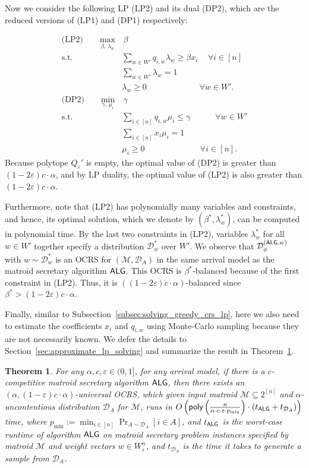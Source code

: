 \documentclass[11pt]{article}
\newcommand{\D}{\mathcal D}
\newcommand{\M}{{\mathcal M}}
\newcommand{\alg}{\textnormal{\sffamily ALG}}
\newcommand{\eps}{\varepsilon}
\newcommand{\poly}{\textnormal{\sffamily poly}}
\newtheorem{theorem}{Theorem}[section]
\begin{document}
Now we consider the following LP (LP2) and its dual (DP2), which are the reduced versions of (LP1) and (DP1) respectively:

\begin{align}\label{eq:secretary_to_crs_lp_2}
    \textrm{(LP2)}\qquad\max_{\beta,\,\lambda_w}&\,\beta\nonumber\\
    \textrm{s.t. }& \sum_{w\in W'} q_{i,w}\lambda_w\ge\beta x_i \quad\,\forall i\in [n]\nonumber\\
    & \sum_{w\in W'}\lambda_w=1\nonumber\\
    & \lambda_w\ge 0 \qquad\qquad\qquad\,\,\forall w\in W'.\nonumber\\
    \textrm{(DP2)}\qquad\min_{\gamma,\,\mu_i}&\,\gamma\nonumber\\
    \textrm{s.t. }& \sum_{i\in[n]} q_{i,w}\mu_i\le\gamma \qquad\,\,\,\,\,\,\forall w\in W'\nonumber\\
    & \sum_{i\in[n]}x_i\mu_i=1\nonumber\\
    & \mu_i\ge 0 \qquad\qquad\qquad\,\,\,\,\forall i\in [n].
\end{align}
Because polytope $Q_{\eps}'$ is empty, the optimal value of (DP2) is greater than $(1-2\eps)c\cdot\alpha$, and by LP duality, the optimal value of (LP2) is also greater than $(1-2\eps)c\cdot\alpha$.

Furthermore, note that (LP2) has polynomially many variables and constraints, and hence, its optimal solution, which we denote by $(\beta^*,\lambda^*_w)$, can be computed in polynomial time. By the last two constraints in (LP2), variables $\lambda^*_{w}$ for all $w\in W'$ together specify a distribution $\D_{w}^*$ over $W'$. We observe that $\D_{\phi}^{(\alg,w)}$ with $w\sim\D_{w}^*$ is an OCRS for $(\M,\D_A)$ in the same arrival model as the matroid secretary algorithm $\alg$. This OCRS is $\beta^*$-balanced because of the first constraint in (LP2). Thus, it is $((1-2\eps)c\cdot\alpha)$-balanced since $\beta^*>(1-2\eps)c\cdot\alpha$.

Finally, similar to Subsection~\ref{subsec:solving_greedy_crs_lp}, here we also need to estimate the coefficients $x_i$ and $q_{i,w}$ using Monte-Carlo sampling because they are not necessarily known. We defer the details to Section~\ref{sec:approximate_lp_solving} and summarize the result in Theorem~\ref{thm:secretary_to_ocrs}.
\begin{theorem}\label{thm:secretary_to_ocrs}
For any $\alpha,c,\eps\in(0,1]$, for any arrival model, if there is a $c$-competitive matroid secretary algorithm $\alg$, then there exists an $(\alpha,(1-\eps)c\cdot\alpha)$-universal OCRS, which given input matroid $\M\subseteq2^{[n]}$ and $\alpha$-uncontentious distribution $\D_A$ for $\M$, runs in $O\left(\poly\left(\frac{n}{\alpha\cdot c\cdot\eps\cdot p_{\min}}\right)\cdot(t_{\alg}+t_{\D_A})\right)$ time, where $p_{\min}:=\min_{i\in[n]}\Pr_{A\sim\D_A}[i\in A]$, and $t_{\alg}$ is the worst-case runtime of algorithm $\alg$ on matroid secretary problem instances specified by matroid $\M$ and weight vectors $w\in W_{\eps}^n$, and $t_{\D_A}$ is the time it takes to generate a sample from $\D_A$.
\end{theorem} 

\end{document}
